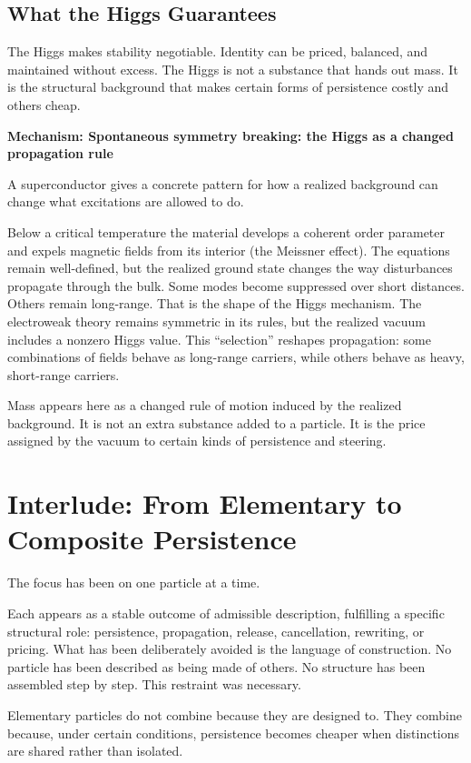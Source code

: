 \documentclass[11pt,twoside,openright]{book}
\newenvironment{mechanismbox}[1]
  {\begin{framed}\noindent\textbf{Mechanism: #1}\par\medskip}
  {\end{framed}}
\begin{document}
\section*{What the Higgs Guarantees}

The Higgs makes stability negotiable. Identity can be priced, balanced, and maintained without excess. The Higgs is not a substance that hands out mass. It is the structural background that makes certain forms of persistence costly and others cheap.

\begin{mechanismbox}{Spontaneous symmetry breaking: the Higgs as a changed propagation rule}
A superconductor gives a concrete pattern for how a realized background can change what excitations are allowed to do.

Below a critical temperature the material develops a coherent order parameter and expels magnetic fields from its interior (the Meissner effect). The equations remain well-defined, but the realized ground state changes the way disturbances propagate through the bulk. Some modes become suppressed over short distances. Others remain long-range. That is the shape of the Higgs mechanism. The electroweak theory remains symmetric in its rules, but the realized vacuum includes a nonzero Higgs value. This ``selection'' reshapes propagation: some combinations of fields behave as long-range carriers, while others behave as heavy, short-range carriers.

Mass appears here as a changed rule of motion induced by the realized background.
It is not an extra substance added to a particle.
It is the price assigned by the vacuum to certain kinds of persistence and steering.
\end{mechanismbox}
\clearpage
{%
  \let\cleardoublepage\clearpage
  \chapter{Interlude: From Elementary to Composite Persistence}
}
The focus has been on one particle at a time.

Each appears as a stable outcome of admissible description, fulfilling a specific structural role: persistence, propagation, release, cancellation, rewriting, or pricing. What has been deliberately avoided is the language of construction. No particle has been described as being made of others. No structure has been assembled step by step. This restraint was necessary.

Elementary particles do not combine because they are designed to. They combine because, under certain conditions, persistence becomes cheaper when distinctions are shared rather than isolated.
\end{document}
